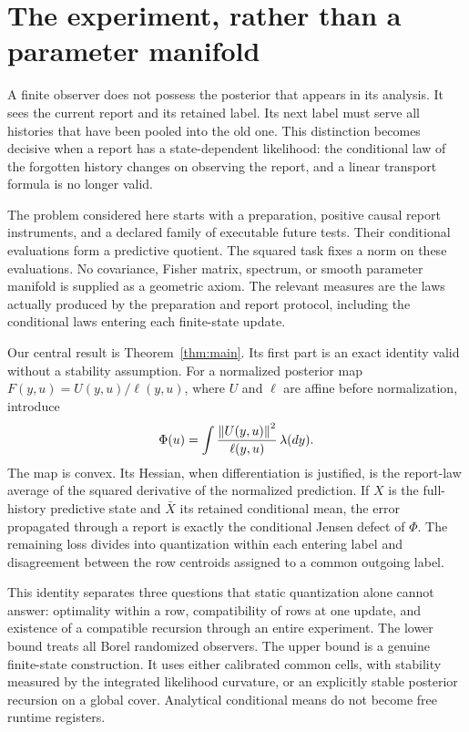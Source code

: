 \section{The experiment, rather than a parameter manifold}
A finite observer does not possess the posterior that appears in its analysis. It sees the current report and its retained label. Its next label must serve all histories that have been pooled into the old one. This distinction becomes decisive when a report has a state-dependent likelihood: the conditional law of the forgotten history changes on observing the report, and a linear transport formula is no longer valid.

The problem considered here starts with a preparation, positive causal report instruments, and a declared family of executable future tests. Their conditional evaluations form a predictive quotient. The squared task fixes a norm on these evaluations. No covariance, Fisher matrix, spectrum, or smooth parameter manifold is supplied as a geometric axiom. The relevant measures are the laws actually produced by the preparation and report protocol, including the conditional laws entering each finite-state update.

Our central result is Theorem~\ref{thm:main}. Its first part is an exact identity valid without a stability assumption. For a normalized posterior map $F(y,u)=U(y,u)/\ell(y,u)$, where $U$ and $\ell$ are affine before normalization, introduce
\[
 \Phi(u)=\int\frac{\left\lVert U(y,u)\right\rVert^2}{\ell(y,u)}\,\lambda(dy).
\]
The map is convex. Its Hessian, when differentiation is justified, is the report-law average of the squared derivative of the normalized prediction. If $X$ is the full-history predictive state and $\bar X$ its retained conditional mean, the error propagated through a report is exactly the conditional Jensen defect of $\Phi$. The remaining loss divides into quantization within each entering label and disagreement between the row centroids assigned to a common outgoing label.

This identity separates three questions that static quantization alone cannot answer: optimality within a row, compatibility of rows at one update, and existence of a compatible recursion through an entire experiment. The lower bound treats all Borel randomized observers. The upper bound is a genuine finite-state construction. It uses either calibrated common cells, with stability measured by the integrated likelihood curvature, or an explicitly stable posterior recursion on a global cover. Analytical conditional means do not become free runtime registers.

